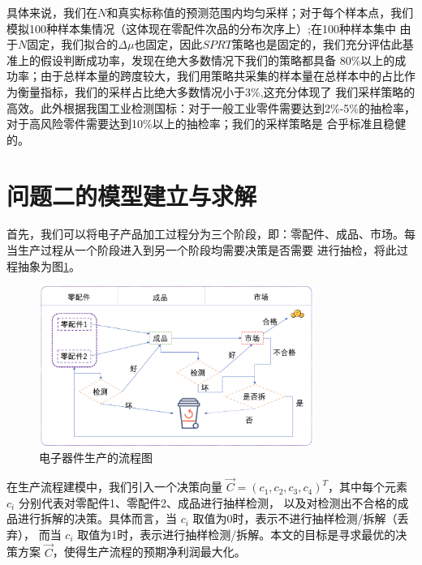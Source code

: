 \documentclass[withoutpreface,bwprint]{cumcmthesis} %
\begin{document}
具体来说，我们在$N$和真实标称值的预测范围内均匀采样；对于每个样本点，我们模拟100种样本集情况（这体现在零配件次品的分布次序上）;在100种样本集中
由于$N$固定，我们拟合的$\Delta \mu$也固定，因此$SPRT$策略也是固定的，我们充分评估此基准上的假设判断成功率，发现在绝大多数情况下我们的策略都具备
80\%以上的成功率；由于总样本量的跨度较大，我们用策略共采集的样本量在总样本中的占比作为衡量指标，我们的采样占比绝大多数情况小于3\%,这充分体现了
我们采样策略的高效。此外根据我国工业检测国标：对于一般工业零件需要达到2\%-5\%的抽检率\cite{GB/T2828.1-2012}，对于高风险零件需要达到10\%以上的抽检率；我们的采样策略是
合乎标准且稳健的。
\section{问题二的模型建立与求解}
首先，我们可以将电子产品加工过程分为三个阶段，即：零配件、成品、市场。每当生产过程从一个阶段进入到另一个阶段均需要决策是否需要
进行抽检，将此过程抽象为图\ref{fig:pro2}。
\begin{figure}[H]
	\centering
	\includegraphics[width=0.8\textwidth,height = 0.4\textwidth]{Fig/pro2.png}      %
	\caption{电子器件生产的流程图}
	\label{fig:pro2}
\end{figure}
在生产流程建模中，我们引入一个决策向量 $\vec{C}=(c_{1},c_{2},c_{3},c_{4})^{T}$，其中每个元素 $c_i$ 分别代表对零配件1、零配件2、成品进行抽样检测，
以及对检测出不合格的成品进行拆解的决策。具体而言，当 $c_{i}$ 取值为0时，表示不进行抽样检测/拆解（丢弃），
而当 $c_{i}$ 取值为1时，表示进行抽样检测/拆解。本文的目标是寻求最优的决策方案 $\vec{C}$，使得生产流程的预期净利润最大化。
\end{document}
